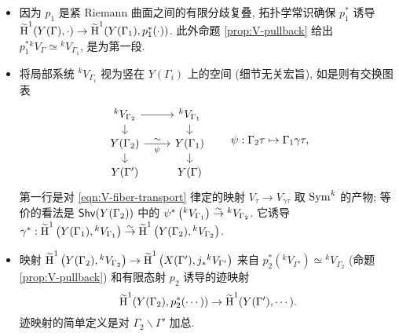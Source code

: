 \begin{itemize}
	\item 因为 $p_1$ 是紧 Riemann 曲面之间的有限分歧复叠, 拓扑学常识确保 $p_1^*$ 诱导 $\widetilde{\operatorname{H}}^1(Y(\Gamma), \cdot) \to \widetilde{\operatorname{H}}^1(Y(\Gamma_1), p_1^*(\cdot))$. 此外命题 \ref{prop:V-pullback} 给出 $p_1^* {}^k V_{\Gamma} \simeq {}^k V_{\Gamma_1}$, 是为第一段.

	\item 将局部系统 ${}^k V_{\Gamma_i}$ 视为竖在 $Y(\Gamma_i)$ 上的空间 (细节无关宏旨), 如是则有交换图表
	\begin{equation}\label{eqn:corr-diagram}\begin{tikzcd}[row sep=small]
		{}^k V_{\Gamma_2} \arrow[d] \arrow[r] & {}^k V_{\Gamma_1} \arrow[d] \\
		Y(\Gamma_2) \arrow[r, "\psi"', "\sim"] \arrow[d] & Y(\Gamma_1) \arrow[d] \\
		Y(\Gamma') & Y(\Gamma)
	\end{tikzcd} \qquad \psi: \Gamma_2 \tau \mapsto \Gamma_1 \gamma \tau, \end{equation}
	第一行是对 \eqref{eqn:V-fiber-transport} 律定的映射 $V_\tau \to V_{\gamma\tau}$ 取 $\operatorname{Sym}^k$ 的产物; 等价的看法是 $\mathsf{Shv}(Y(\Gamma_2))$ 中的 $\psi^* \left( {}^k V_{\Gamma_1} \right) \stackrel{\sim}{\rightarrow} {}^k V_{\Gamma_2}$. 它诱导 $\gamma^*: \widetilde{\operatorname{H}}^1\left(Y(\Gamma_1), {}^k V_{\Gamma_1} \right) \stackrel{\sim}{\rightarrow} \widetilde{\operatorname{H}}^1\left(Y(\Gamma_2), {}^k V_{\Gamma_2} \right)$.
	
	\item 映射 $\widetilde{\operatorname{H}}^1\left(Y(\Gamma_2), {}^k V_{\Gamma_2} \right) \to \widetilde{\operatorname{H}}^1\left(X(\Gamma'), j_* {}^k V_{\Gamma'} \right)$ 来自 $p_2^* \left( {}^k V_{\Gamma'} \right) \simeq {}^k V_{\Gamma_2}$ (命题 \ref{prop:V-pullback}) 和有限态射 $p_2$ 诱导的迹映射
	\[ \widetilde{\operatorname{H}}^1(Y(\Gamma_2), p_2^*(\cdots)) \to \widetilde{\operatorname{H}}^1(Y(\Gamma'), \cdots). \]
	迹映射的简单定义是对 $\Gamma_2 \backslash \Gamma'$ 加总.
\end{itemize}

